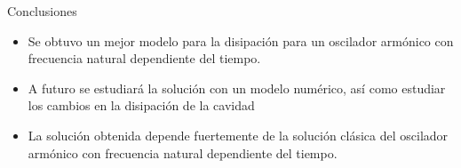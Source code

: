\documentclass[10pt]{beamer}
\begin{document}
\begin{frame}{Conclusiones}

\begin{itemize}
\item Se obtuvo un mejor modelo para la disipación para un oscilador armónico con frecuencia natural dependiente del tiempo.

\item A futuro se estudiará la solución con un modelo numérico, así como estudiar los cambios en la disipación de la cavidad

\item La solución obtenida depende fuertemente de la solución clásica del oscilador armónico con frecuencia natural dependiente del tiempo.
\end{itemize}


\end{frame}
\end{document}
